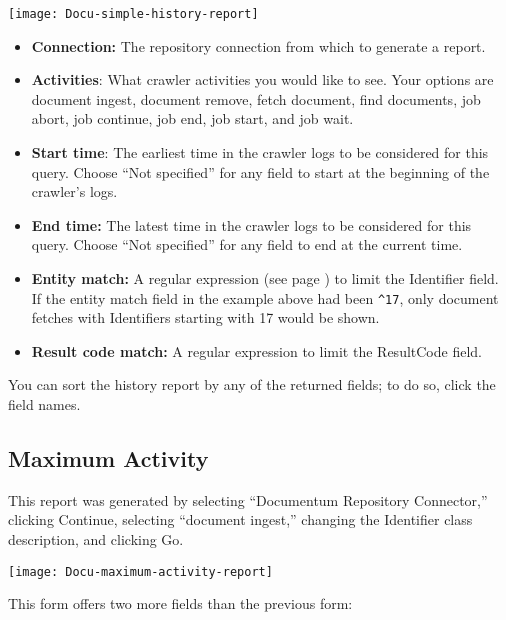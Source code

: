 \begin{changemargin}{1.5in}{0in}
\texttt{[image: Docu-simple-history-report]}

\begin{itemize}

\item \textbf{Connection:} The repository connection from which to generate
a report.

\item \textbf{Activities}: What crawler activities you would like to see. 
Your options are document ingest, document remove, fetch document, find 
documents, job abort, job continue, job end, job start, and job wait. 

\item \textbf{Start time}: The earliest time in the crawler logs to be
considered for this query.  Choose ``Not specified'' for any field to
start at the beginning of the crawler's logs.

\item \textbf{End time:} The latest time in the crawler logs to be
considered for this query. Choose ``Not specified'' for any field 
to end at the current time.

\item \textbf{Entity match:} A regular expression (see page
\pageref{regex}) to limit the Identifier field. If the entity match
field in the example above had been \texttt{\^{}17}, only document
fetches with Identifiers starting with 17 would be shown.

\item \textbf{Result code match:} A regular expression to limit the
ResultCode field.

\end{itemize}

You can sort the history report by any of the returned fields; to do so,
click the field names.


\subsection{Maximum Activity}

This report was generated by selecting ``Documentum Repository Connector,''
clicking Continue, selecting ``document ingest,'' changing the Identifier
class description, and clicking Go.

\texttt{[image: Docu-maximum-activity-report]}

This form offers two more fields than the previous form:

\begin{itemize}


\end{itemize}
\end{changemargin}
